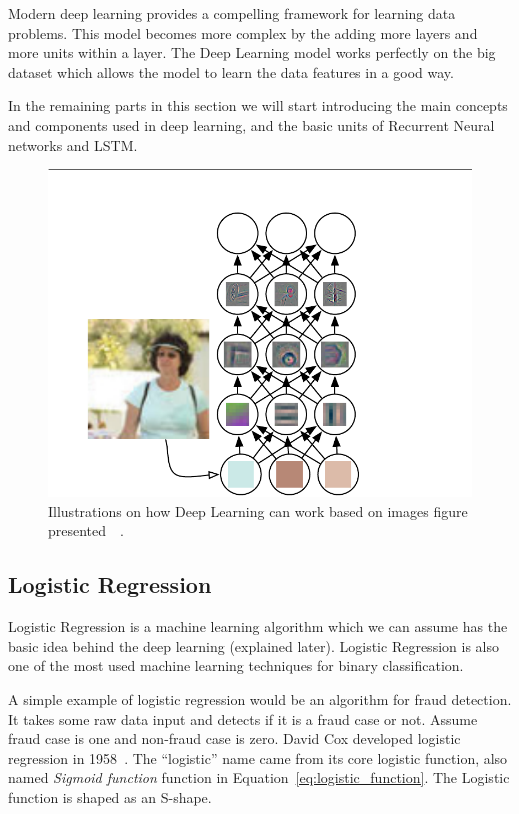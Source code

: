 Modern deep learning provides a compelling framework for learning data problems. This model becomes more complex by the adding more layers and more units within a layer. The Deep Learning model works perfectly on the big dataset which allows the model to learn the data features in a good way.

In the remaining parts in this section we will start introducing the main concepts and components used in deep learning, and the basic units of Recurrent Neural networks and LSTM.%
\begin{figure}[!t] \includegraphics[width=\linewidth]{./Figures/Ch_2_Background/DeepLearningImagePersonExample.png}
 \caption{Illustrations on how Deep Learning can work based on images figure presented~\cite{Goodfellow-et-al-2016}~\cite{Zeiler2014}.}
 \label{Fig:Deep_Learning_Image_Person_Example}
\end{figure}

\subsection{Logistic Regression}


Logistic Regression is a machine learning algorithm which we can assume has the basic idea behind the deep learning (explained later). Logistic Regression is also one of the most used machine learning techniques for binary classification.

A simple example of logistic regression would be an algorithm for fraud detection. It takes some raw data input and detects if it is a fraud case or not. Assume fraud case is one and non-fraud case is zero. David Cox developed logistic regression in 1958~\cite{Cox2958}. The “logistic” name came from its core logistic function, also named \textit{Sigmoid function} function in Equation~\eqref{eq:logistic_function}. The Logistic function is shaped as an S-shape.

